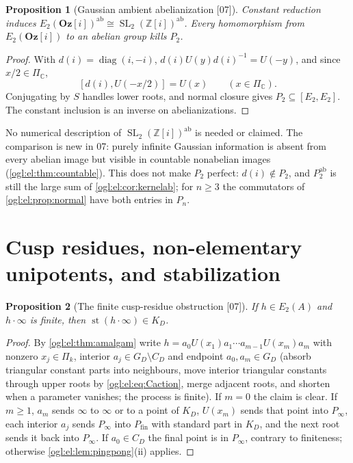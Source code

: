 \documentclass[11pt,oneside]{article}
\numberwithin{equation}{section}
\newtheorem{proposition}[proposition]{Proposition}
\theoremstyle{definition}
\theoremstyle{remark}
\newcommand{\GOz}{\mathbf{Oz}[i]}
\newcommand{\Z}{\mathbb Z}
\newcommand{\C}{\mathbb C}
\newcommand{\st}{\operatorname{st}}
\newcommand{\SL}{\operatorname{SL}}
\newcommand{\diag}{\operatorname{diag}}
\newcommand{\ab}{\mathrm{ab}}
\newcommand{\src}[1]{\textup{\textsf{\small[#1]}}}
\begin{document}
\begin{proposition}[Gaussian ambient abelianization \src{07}]\label{ogl:el:prop:gaussianab}
Constant reduction induces $E_2(\GOz)^{\ab}\cong\SL_2(\Z[i])^{\ab}$. Every
homomorphism from $E_2(\GOz)$ to an abelian group kills $P_2$.
\end{proposition}
\begin{proof}
With $d(i)=\diag(i,-i)$, $d(i)U(y)d(i)^{-1}=U(-y)$, and since $x/2\in\Pi_\C$,
\begin{equation}\label{ogl:el:eq:gaussiancomm}
 [d(i),U(-x/2)]=U(x)\qquad(x\in\Pi_\C).
\end{equation}
Conjugating by $S$ handles lower roots, and normal closure gives
$P_2\subseteq[E_2,E_2]$. The constant inclusion is an inverse on
abelianizations.
\end{proof}

No numerical description of $\SL_2(\Z[i])^{\ab}$ is needed or claimed. The
comparison is new in 07: purely infinite Gaussian information is absent from
every abelian image but visible in countable nonabelian images
(\cref{ogl:el:thm:countable}). This does not make $P_2$ perfect: $d(i)\notin P_2$,
and $P_2^{\ab}$ is still the large sum of \cref{ogl:el:cor:kernelab}; for $n\ge3$
the commutators of \cref{ogl:el:prop:normal} have both entries in $P_n$.

\section{Cusp residues, non-elementary unipotents, and stabilization}\label{ogl:el:sec:stabilization}

\begin{proposition}[The finite cusp-residue obstruction \src{07}]\label{ogl:el:prop:cuspresidue}
If $h\in E_2(A)$ and $h\cdot\infty$ is finite, then $\st(h\cdot\infty)\in K_D$.
\end{proposition}
\begin{proof}
By \cref{ogl:el:thm:amalgam} write
$h=a_0U(x_1)a_1\cdots a_{m-1}U(x_m)a_m$ with nonzero $x_j\in\Pi_k$, interior
$a_j\in G_D\setminus C_D$ and endpoint $a_0,a_m\in G_D$ (absorb triangular
constant parts into neighbours, move interior triangular constants through upper
roots by \eqref{ogl:el:eq:Caction}, merge adjacent roots, and shorten when a
parameter vanishes; the process is finite). If $m=0$ the claim is clear. If
$m\ge1$, $a_m$ sends $\infty$ to $\infty$ or to a point of $K_D$, $U(x_m)$ sends
that point into $P_\infty$, each interior $a_j$ sends $P_\infty$ into
$P_{\mathrm{fin}}$ with standard part in $K_D$, and the next root sends it back
into $P_\infty$. If $a_0\in C_D$ the final point is in $P_\infty$, contrary to
finiteness; otherwise \cref{ogl:el:lem:pingpong}(ii) applies.
\end{proof}
\end{document}
